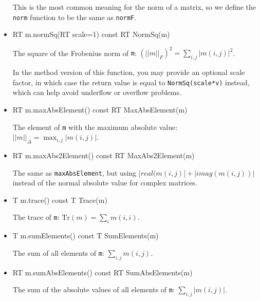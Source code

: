 \documentclass[twoside,letterpaper,11pt]{article}
\renewcommand{\tt}[1]{{\lstinline {#1}}}
\begin{document}
\begin{itemize}
This is the most common meaning for the norm of a matrix, so we
define the \tt{norm} function to be the same as \tt{normF}.

\item
\begin{tmvcode}
RT m.normSq(RT scale=1) const
RT NormSq(m)
\end{tmvcode}
The square of the Frobenius norm of \tt{m}: 
$(||m||_F)^2 = \sum_{i,j} |m(i,j)|^2$.

In the method version of this function, you may provide an optional scale factor,
in which case the return value is equal to \tt{NormSq(scale*v)} instead, 
which can help avoid underflow or overflow problems.

\item
\begin{tmvcode}
RT m.maxAbsElement() const
RT MaxAbsElement(m)
\end{tmvcode}
The element of \tt{m} with the maximum absolute value: 
$||m||_\Delta = \max_{i,j} |m(i,j)|$.

\item
\begin{tmvcode}
RT m.maxAbs2Element() const
RT MaxAbs2Element(m)
\end{tmvcode}
The same as \tt{maxAbsElement}, but using $|real(m(i,j)| + |imag(m(i,j))|$ instead
of the normal absolute value for complex matrices.

\item
\begin{tmvcode}
T m.trace() const
T Trace(m)
\end{tmvcode}
The trace of \tt{m}: $\mathrm{Tr}(m) = \sum_i m(i,i)$.

\item
\begin{tmvcode}
T m.sumElements() const
T SumElements(m)
\end{tmvcode}
The sum of all elements of \tt{m}: $\sum_{i,j} m(i,j)$.

\item
\begin{tmvcode}
RT m.sumAbsElements() const
RT SumAbsElements(m)
\end{tmvcode}
The sum of the absolute values of all elements of \tt{m}: $\sum_{i,j} |m(i,j)|$.


\end{itemize}
\end{document}
